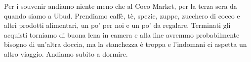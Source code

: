Per i souvenir andiamo niente meno che al Coco Market, per la terza sera da quando siamo a Ubud. Prendiamo caffè, tè, spezie, zuppe, zucchero di cocco e altri prodotti alimentari, un po' per noi e un po' da regalare. Terminati gli acquisti torniamo di buona lena in camera e alla fine avremmo probabilmente bisogno di un'altra doccia, ma la stanchezza è troppa e l'indomani ci aspetta un altro viaggio. Andiamo subito a dormire.

\pagestyle{empty} %

%

%

%

%

%

%
%

\pagestyle{fancy} %